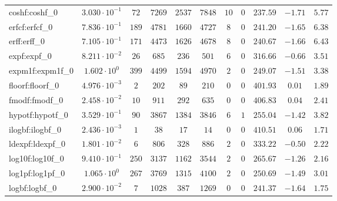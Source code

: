 \begin{tabular}{|l|c|c|c|c|c|c|c|c|c|c|}
coshf:coshf\_0               & $ 3.030 \cdot 10^{-1} $ & $ 72     $ & $ 7269   $ & $ 2537  $ & $ 7848   $ & $ 10  $ & $ 0 $ & $ 237.59      $ & $ -1.71   $ & $ 5.77    $ \\
erfcf:erfcf\_0               & $ 7.836 \cdot 10^{-1} $ & $ 189    $ & $ 4781   $ & $ 1660  $ & $ 4727   $ & $ 8   $ & $ 0 $ & $ 241.20      $ & $ -1.65   $ & $ 6.38    $ \\
erff:erff\_0                 & $ 7.105 \cdot 10^{-1} $ & $ 171    $ & $ 4473   $ & $ 1626  $ & $ 4678   $ & $ 8   $ & $ 0 $ & $ 240.67      $ & $ -1.66   $ & $ 6.43    $ \\
expf:expf\_0                 & $ 8.211 \cdot 10^{-2} $ & $ 26     $ & $ 685    $ & $ 236   $ & $ 501    $ & $ 6   $ & $ 0 $ & $ 316.66      $ & $ -0.66   $ & $ 3.51    $ \\
expm1f:expm1f\_0             & $ 1.602 \cdot 10^{0}  $ & $ 399    $ & $ 4499   $ & $ 1594  $ & $ 4970   $ & $ 2   $ & $ 0 $ & $ 249.07      $ & $ -1.51   $ & $ 3.38    $ \\
floorf:floorf\_0             & $ 4.976 \cdot 10^{-3} $ & $ 2      $ & $ 202    $ & $ 89    $ & $ 210    $ & $ 0   $ & $ 0 $ & $ 401.93      $ & $ 0.01    $ & $ 1.89    $ \\
fmodf:fmodf\_0               & $ 2.458 \cdot 10^{-2} $ & $ 10     $ & $ 911    $ & $ 292   $ & $ 635    $ & $ 0   $ & $ 0 $ & $ 406.83      $ & $ 0.04    $ & $ 2.41    $ \\
hypotf:hypotf\_0             & $ 3.529 \cdot 10^{-1} $ & $ 90     $ & $ 3867   $ & $ 1384  $ & $ 3846   $ & $ 6   $ & $ 1 $ & $ 255.04      $ & $ -1.42   $ & $ 3.82    $ \\
ilogbf:ilogbf\_0             & $ 2.436 \cdot 10^{-3} $ & $ 1      $ & $ 38     $ & $ 17    $ & $ 14     $ & $ 0   $ & $ 0 $ & $ 410.51      $ & $ 0.06    $ & $ 1.71    $ \\
ldexpf:ldexpf\_0             & $ 1.801 \cdot 10^{-2} $ & $ 6      $ & $ 806    $ & $ 328   $ & $ 886    $ & $ 2   $ & $ 0 $ & $ 333.22      $ & $ -0.50   $ & $ 2.22    $ \\
log10f:log10f\_0             & $ 9.410 \cdot 10^{-1} $ & $ 250    $ & $ 3137   $ & $ 1162  $ & $ 3544   $ & $ 2   $ & $ 0 $ & $ 265.67      $ & $ -1.26   $ & $ 2.16    $ \\
log1pf:log1pf\_0             & $ 1.065 \cdot 10^{0}  $ & $ 267    $ & $ 3769   $ & $ 1315  $ & $ 4100   $ & $ 2   $ & $ 0 $ & $ 250.69      $ & $ -1.49   $ & $ 3.01    $ \\
logbf:logbf\_0               & $ 2.900 \cdot 10^{-2} $ & $ 7      $ & $ 1028   $ & $ 387   $ & $ 1269   $ & $ 0   $ & $ 0 $ & $ 241.37      $ & $ -1.64   $ & $ 1.75    $ \\

\end{tabular}
